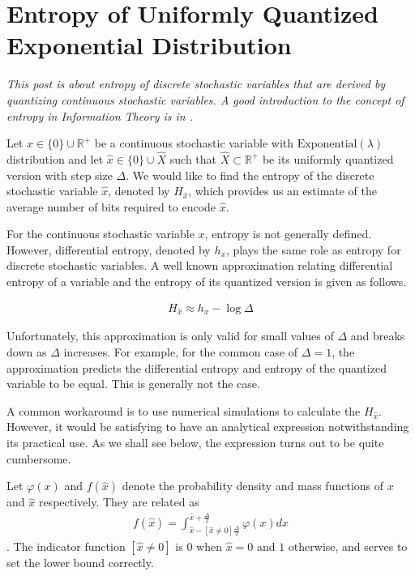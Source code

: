 \section{Entropy of Uniformly Quantized Exponential Distribution}
\label{sec:003_entropy}

\emph{This post is about entropy of discrete stochastic variables that are derived by quantizing continuous stochastic variables. A good introduction to the concept of entropy in Information Theory is in \cite{Cover2012}.}

Let $x \in \{0\} \cup \mathbb{R}^+ $ be a continuous stochastic variable with $\text{Exponential}(\lambda)$ distribution and let $\hat{x} \in \{0\} \cup \hat{X}$ such that $\hat{X} \subset \mathbb{R}^+$ be its uniformly quantized version with step size $\Delta$. We would like to find the entropy of the discrete stochastic variable $\hat{x}$, denoted by $H_{\hat{x}}$, which provides us an estimate of the average number of bits required to encode $\hat{x}$.

For the continuous stochastic variable $x$, entropy is not generally defined. However, differential entropy, denoted by $h_x$, plays the same role as entropy for discrete stochastic variables. A well known approximation relating differential entropy of a variable and the entropy of its quantized version is given as follows.

\begin{align} H_{\hat{x}} \approx h_x - \log \Delta \end{align}

Unfortunately, this approximation is only valid for small values of $\Delta$ and breaks down as $\Delta$ increases. For example, for the common case of $\Delta = 1$, the approximation predicts the differential entropy and entropy of the quantized variable to be equal. This is generally not the case.

A common workaround is to use numerical simulations to calculate the $H_{\hat{x}}$. However, it would be satisfying to have an analytical expression notwithstanding its practical use. As we shall see below, the expression turns out to be quite cumbersome.

Let $\varphi(x)$ and $f(\hat{x})$ denote the probability density and mass functions of $x$ and $\hat{x}$ respectively. They are related as 
\begin{align}f(\hat{x}) = \int_{\hat{x} - [\hat{x} \neq 0]\frac{\Delta}{2}}^{\hat{x} + \frac{\Delta}{2}} \varphi(x) dx\end{align}. 
The indicator function $[\hat{x} \neq 0]$ is $0$ when $\hat{x} = 0$ and $1$ otherwise, and serves to set the lower bound correctly.

